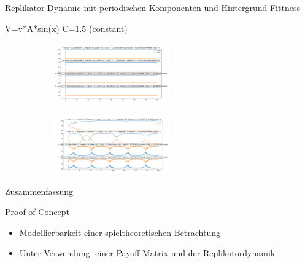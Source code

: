 \documentclass{beamer}
\begin{document}
\begin{frame}{Replikator Dynamic mit periodischen Komponenten und Hintergrund Fittness}
    \begin{block}{V=v*A*sin(x) C=1.5 (constant)}
    \begin{itemize}
        \begin{figure}[htp]
            \centering
            \begin{subfigure}
                \centering
                \includegraphics[width=5cm]{Figs/ohne_b.png}
                \label{fig:}
            \end{subfigure}
            \hfill
            \begin{subfigure}
                \centering
                \includegraphics[width=5cm]{Figs/b.png}
                \label{fig:}
            \end{subfigure}
            \hfill
        \end{figure}
    \end{itemize}
    \end{block} 
\end{frame}






















      \begin{frame}{Zusammenfassung}
    \begin{block}{Proof of Concept}
    \begin{itemize}
        \item Modellierbarkeit einer spieltheoretischen Betrachtung
        \item Unter Verwendung: einer Payoff-Matrix und der Replikatordynamik
    \end{itemize}
    \end{block} \pause
\end{frame}
\end{document}
